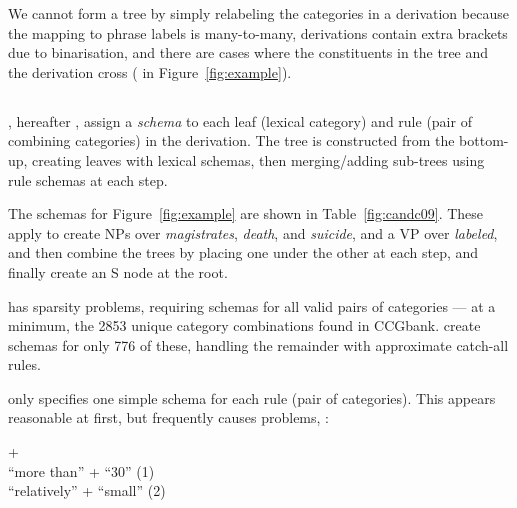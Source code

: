 We cannot form a \ptb tree by simply relabeling the categories in a \ccg
derivation because the mapping to phrase labels is many-to-many, \ccg
derivations contain extra brackets due to binarisation, and there are cases
where the constituents in the \ptb tree and the \ccg derivation cross (\myeg
in Figure~\ref{fig:example}).

\subsection{\textcite{Clark-Curran:2009}}

\textcite{Clark-Curran:2009}, hereafter \old,  assign a {\em schema} to each
leaf (lexical category) and rule (pair of combining categories) in the \ccg derivation.
The \ptb tree is constructed from the \ccg bottom-up, creating leaves with
lexical schemas, then merging/adding sub-trees using rule schemas at each step.

The schemas for Figure~\ref{fig:example} are shown in Table~\ref{fig:candc09}.
These apply to create NPs over \textit{magistrates}, \textit{death}, and
\textit{suicide}, and a VP over \textit{labeled}, and then combine the trees by
placing one under the other at each step, and finally create an S node at the
root.

\old has sparsity problems, requiring schemas for all valid pairs of
categories --- at a minimum, the 2853 unique category combinations found in
CCGbank. \textcite{Clark-Curran:2009} create schemas for only 776 of these,
handling the remainder with approximate catch-all rules.

\old only specifies one simple schema for each rule (pair of
categories).  This appears reasonable at first, but frequently causes
problems, \myeg:

\vspace{2mm}
\parbox{0.97\linewidth}{\footnotesize
{} +  \\
``more than'' + ``30'' \hfill(1)\hspace*{2mm}\\ %
``relatively'' + ``small'' \hfill(2)\hspace*{2mm}\\ %
}
\vspace{-3mm}

